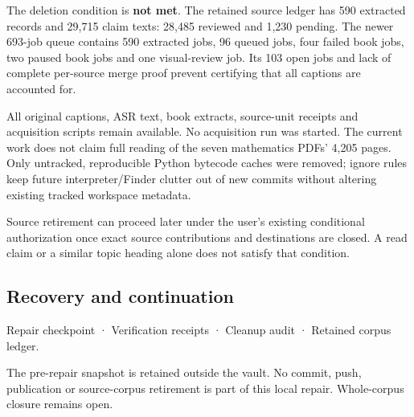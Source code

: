 The deletion condition is \textbf{not met}. The retained source ledger has 590 extracted records and 29,715 claim texts: 28,485 reviewed and 1,230 pending. The newer 693-job queue contains 590 extracted jobs, 96 queued jobs, four failed book jobs, two paused book jobs and one visual-review job. Its 103 open jobs and lack of complete per-source merge proof prevent certifying that all captions are accounted for.

All original captions, ASR text, book extracts, source-unit receipts and acquisition scripts remain available. No acquisition run was started. The current work does not claim full reading of the seven mathematics PDFs' 4,205 pages. Only untracked, reproducible Python bytecode caches were removed; ignore rules keep future interpreter/Finder clutter out of new commits without altering existing tracked workspace metadata.

Source retirement can proceed later under the user's existing conditional authorization once exact source contributions and destinations are closed. A read claim or a similar topic heading alone does not satisfy that condition.

\subsection{Recovery and continuation}\label{appendix-faa2b5a8e820-recovery-and-continuation}

\hypertarget{appendix-faa2b5a8e820-recovery-and-continuation}{}

{Repair checkpoint} · {Verification receipts} · {Cleanup audit} · {Retained corpus ledger}.

The pre-repair snapshot is retained outside the vault. No commit, push, publication or source-corpus retirement is part of this local repair. Whole-corpus closure remains open.
